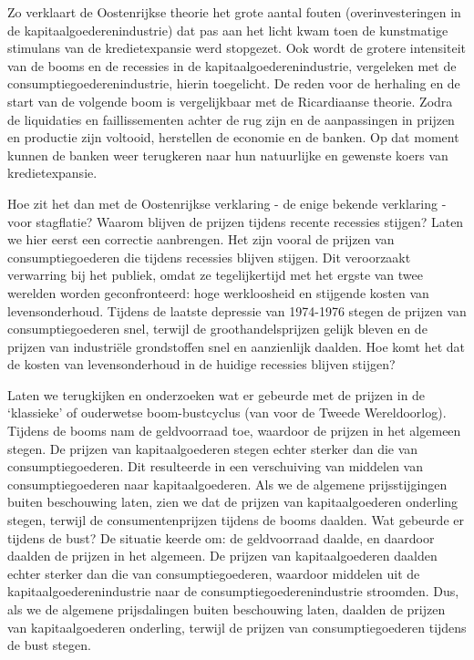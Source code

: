 \documentclass[
  a5paper,
  smalldemyvopaper,10pt,twoside,onecolumn,openright,extrafontsizes,hidelinks]{memoir}
\begin{document}
Zo verklaart de Oostenrijkse theorie het grote aantal fouten
(overinvesteringen in de kapitaalgoederenindustrie) dat pas aan het
licht kwam toen de kunstmatige stimulans van de kredietexpansie werd
stopgezet. Ook wordt de grotere intensiteit van de booms en de recessies
in de kapitaalgoederenindustrie, vergeleken met de
consumptiegoederenindustrie, hierin toegelicht. De reden voor de
herhaling en de start van de volgende boom is vergelijkbaar met de
Ricardiaanse theorie. Zodra de liquidaties en faillissementen achter de
rug zijn en de aanpassingen in prijzen en productie zijn voltooid,
herstellen de economie en de banken. Op dat moment kunnen de banken weer
terugkeren naar hun natuurlijke en gewenste koers van kredietexpansie.

Hoe zit het dan met de Oostenrijkse verklaring - de enige bekende
verklaring - voor stagflatie? Waarom blijven de prijzen tijdens recente
recessies stijgen? Laten we hier eerst een correctie aanbrengen. Het
zijn vooral de prijzen van consumptiegoederen die tijdens recessies
blijven stijgen. Dit veroorzaakt verwarring bij het publiek, omdat ze
tegelijkertijd met het ergste van twee werelden worden geconfronteerd:
hoge werkloosheid en stijgende kosten van levensonderhoud. Tijdens de
laatste depressie van 1974-1976 stegen de prijzen van consumptiegoederen
snel, terwijl de groothandelsprijzen gelijk bleven en de prijzen van
industriële grondstoffen snel en aanzienlijk daalden. Hoe komt het dat
de kosten van levensonderhoud in de huidige recessies blijven stijgen?

Laten we terugkijken en onderzoeken wat er gebeurde met de prijzen in de
`klassieke' of ouderwetse boom-bustcyclus (van voor de Tweede
Wereldoorlog). Tijdens de booms nam de geldvoorraad toe, waardoor de
prijzen in het algemeen stegen. De prijzen van kapitaalgoederen stegen
echter sterker dan die van consumptiegoederen. Dit resulteerde in een
verschuiving van middelen van consumptiegoederen naar kapitaalgoederen.
Als we de algemene prijsstijgingen buiten beschouwing laten, zien we dat
de prijzen van kapitaalgoederen onderling stegen, terwijl de
consumentenprijzen tijdens de booms daalden. Wat gebeurde er tijdens de
bust? De situatie keerde om: de geldvoorraad daalde, en daardoor daalden
de prijzen in het algemeen. De prijzen van kapitaalgoederen daalden
echter sterker dan die van consumptiegoederen, waardoor middelen uit de
kapitaalgoederenindustrie naar de consumptiegoederenindustrie stroomden.
Dus, als we de algemene prijsdalingen buiten beschouwing laten, daalden
de prijzen van kapitaalgoederen onderling, terwijl de prijzen van
consumptiegoederen tijdens de bust stegen.
\end{document}
